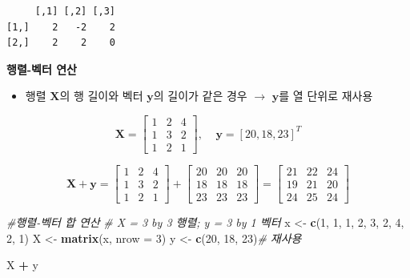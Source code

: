\documentclass[
  11pt,
]{krantz}
\newenvironment{Shaded}{\begin{snugshade}}{\end{snugshade}}
\newcommand{\CommentTok}[1]{\textcolor[rgb]{0.37,0.37,0.37}{\textit{#1}}}
\newcommand{\DataTypeTok}[1]{\textcolor[rgb]{0.27,0.27,0.27}{#1}}
\newcommand{\DecValTok}[1]{\textcolor[rgb]{0.06,0.06,0.06}{#1}}
\newcommand{\KeywordTok}[1]{\textcolor[rgb]{0.27,0.27,0.27}{\textbf{#1}}}
\newcommand{\NormalTok}[1]{#1}
\newcommand{\OperatorTok}[1]{\textcolor[rgb]{0.43,0.43,0.43}{\textbf{#1}}}
\newcommand{\StringTok}[1]{\textcolor[rgb]{0.5,0.5,0.5}{#1}}
\providecommand{\tightlist}{%
  \setlength{\itemsep}{0pt}\setlength{\parskip}{0pt}}
\begin{document}
\begin{verbatim}
     [,1] [,2] [,3]
[1,]    2   -2    2
[2,]    2    2    0
\end{verbatim}

\normalsize

\textbf{행렬-벡터 연산}

\begin{itemize}
\tightlist
\item
  행렬 \(\mathrm{\mathbf{X}}\)의 행 길이와 벡터 \(\mathrm{\mathbf y}\)의 길이가 같은 경우 \(\rightarrow\) \(\mathrm{\mathbf y}\)를 열 단위로 재사용
\end{itemize}

\[\mathrm{\mathbf{X}} = 
\begin{bmatrix}
1 & 2 & 4\\
1 & 3 & 2\\
1 & 2 & 1
\end{bmatrix}, ~~~~~
\mathrm{\mathbf y} = [20, 18, 23]^T
\]

\[\mathrm{\mathbf{X}} + \mathrm{\mathbf{y}} = 
\begin{bmatrix}
1 & 2 & 4\\
1 & 3 & 2\\
1 & 2 & 1
\end{bmatrix} + 
\begin{bmatrix}
20 & 20 & 20\\
18 & 18 & 18\\
23 & 23 & 23
\end{bmatrix} = 
\begin{bmatrix}
21 & 22 & 24\\
19 & 21 & 20\\
24 & 25 & 24
\end{bmatrix}
\]

\footnotesize

\begin{Shaded}
\begin{Highlighting}[]
\CommentTok{#행렬-벡터 합 연산}
\CommentTok{# X = 3 by 3 행렬; y = 3 by 1 벡터}
\NormalTok{x <-}\StringTok{ }\KeywordTok{c}\NormalTok{(}\DecValTok{1}\NormalTok{, }\DecValTok{1}\NormalTok{, }\DecValTok{1}\NormalTok{, }\DecValTok{2}\NormalTok{, }\DecValTok{3}\NormalTok{, }\DecValTok{2}\NormalTok{, }\DecValTok{4}\NormalTok{, }\DecValTok{2}\NormalTok{, }\DecValTok{1}\NormalTok{)}
\NormalTok{X <-}\StringTok{ }\KeywordTok{matrix}\NormalTok{(x, }\DataTypeTok{nrow =} \DecValTok{3}\NormalTok{)}
\NormalTok{y <-}\StringTok{ }\KeywordTok{c}\NormalTok{(}\DecValTok{20}\NormalTok{, }\DecValTok{18}\NormalTok{, }\DecValTok{23}\NormalTok{)}\CommentTok{# 재사용}

\NormalTok{X }\OperatorTok{+}\StringTok{ }\NormalTok{y}
\end{Highlighting}
\end{Shaded}
\end{document}
